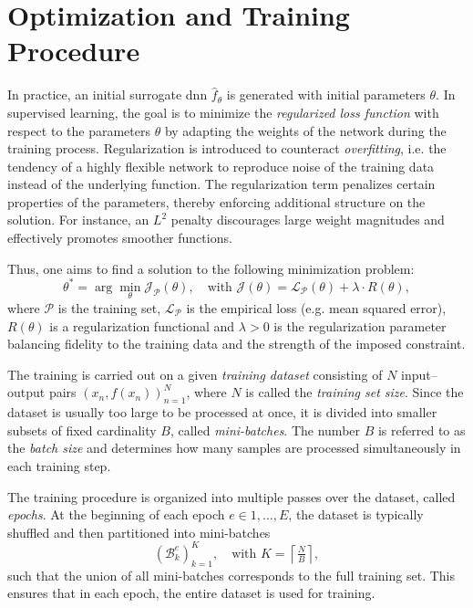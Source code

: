\section{Optimization and Training Procedure}
\label{sec:dnn-training}
In practice, an initial surrogate \ac{dnn} $\hat{f}_\theta$ is generated with
initial parameters $\theta$. In supervised learning, the goal is to minimize the
\emph{regularized loss function} with respect to the parameters $\theta$ by
adapting the weights of the network during the training process. Regularization
is introduced to counteract \emph{overfitting}, i.e. the tendency of a highly
flexible network to reproduce noise of the training data instead of the
underlying function. The regularization term penalizes certain properties of the
parameters, thereby enforcing additional structure on the solution. For
instance, an $L^2$ penalty discourages large weight magnitudes and effectively
promotes smoother functions.

Thus, one aims to find a solution to the following minimization problem:
\begin{equation*}
    \theta^* = \arg\min_{\theta} \mathcal{J}_\mathcal{P}(\theta),
    \quad \text{with } 
    \mathcal{J}(\theta) = \mathcal{L}_\mathcal{P}(\theta) + \lambda \cdot R(\theta),
\end{equation*}
where $\mathcal{P}$ is the training set, $\mathcal{L}_\mathcal{P}$ is the
empirical loss (e.g. mean squared error), $R(\theta)$ is a regularization
functional and $\lambda > 0$ is the regularization parameter balancing fidelity
to the training data and the strength of the imposed constraint.

The training is carried out on a given \emph{training dataset} consisting of
$N$ input--output pairs ${(x_n, f(x_n))}_{n=1}^N$, where $N$ is called the
\emph{training set size}. Since the dataset is usually too large to be processed
at once, it is divided into smaller subsets of fixed cardinality $B$, called
\emph{mini-batches}. The number $B$ is referred to as the \emph{batch size} and
determines how many samples are processed simultaneously in each training step.

The training procedure is organized into multiple passes over the dataset,
called \emph{epochs}. At the beginning of each epoch $e \in {1, \dots, E}$, the
dataset is typically shuffled and then partitioned into mini-batches
\begin{equation*}
(\mathcal{B}^e_k)_{k=1}^{K}, \quad
\text{with } K = \left\lceil \tfrac{N}{B} \right\rceil,
\end{equation*}
such that the union of all mini-batches corresponds to the full training set.
This ensures that in each epoch, the entire dataset is used for training.

